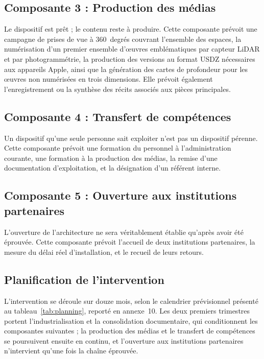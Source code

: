 \subsection{Composante 3 : Production des médias}

Le dispositif est prêt ; le contenu reste à produire. Cette composante prévoit
une campagne de prises de vue à 360~degrés couvrant l'ensemble des espaces, la
numérisation d'un premier ensemble d'œuvres emblématiques par capteur LiDAR et
par photogrammétrie, la production des versions au format USDZ nécessaires aux
appareils Apple, ainsi que la génération des cartes de profondeur pour les
œuvres non numérisées en trois dimensions. Elle prévoit également
l'enregistrement ou la synthèse des récits associés aux pièces principales.

\subsection{Composante 4 : Transfert de compétences}

Un dispositif qu'une seule personne sait exploiter n'est pas un dispositif
pérenne. Cette composante prévoit une formation du personnel à l'administration
courante, une formation à la production des médias, la remise d'une
documentation d'exploitation, et la désignation d'un référent interne.

\subsection{Composante 5 : Ouverture aux institutions partenaires}

L'ouverture de l'architecture ne sera véritablement établie qu'après avoir été
éprouvée. Cette composante prévoit l'accueil de deux institutions partenaires,
la mesure du délai réel d'installation, et le recueil de leurs retours.

\subsection{Planification de l'intervention}

L'intervention se déroule sur douze mois, selon le calendrier prévisionnel
présenté au tableau~\ref{tab:planning}, reporté en annexe~10. Les deux
premiers trimestres portent l'industrialisation et la consolidation
documentaire, qui conditionnent les composantes suivantes ; la production des
médias et le transfert de compétences se poursuivent ensuite en continu, et
l'ouverture aux institutions partenaires n'intervient qu'une fois la chaîne
éprouvée.

